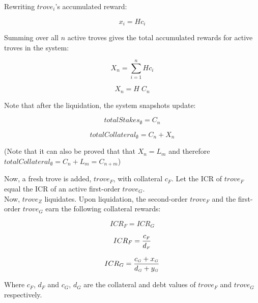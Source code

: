 \documentclass[reqno]{article}
\begin{document}
Rewriting $trove_i$’s accumulated reward:

\begin{equation} \label{eq:45}
    x_i=Hc_i
\end{equation}

\bigskip
Summing over all $n$ active troves gives the total accumulated rewards for active troves in the system:

\begin{equation} 
    X_n=\sum\limits^n_{i=1}Hc_i
\end{equation}

\begin{equation} \label{eq:47}
    X_n=H \; C_n
\end{equation}

\bigskip
Note that after the liquidation, the system snapshots update:

\begin{equation} \label{eq:8}
    totalStakes_\emptyset=C_n
\end{equation}

\begin{equation} \label{eq:9}
    totalCollateral_\emptyset=C_n+X_n
\end{equation}

\bigskip
(Note that it can also be proved that that $X_n=L_m$ and therefore $totalCollateral_\emptyset=C_n+L_m=C_{n+m}$)

\bigskip
Now, a fresh trove is added, $trove_F$, with collateral $c_F$.  Let the ICR of $trove_F$ equal the ICR of an active first-order $trove_G$.\\

Now, $trove_Z$ liquidates. Upon liquidation, the second-order $trove_F$ and the first-order $trove_G$ earn the following collateral rewards:

\begin{equation} \label{eq:10}
    ICR_F=ICR_G
\end{equation}

\begin{equation} 
    ICR_F=\frac{c_\mathsmaller{F}}{d_\mathsmaller{F}}
\end{equation}

\begin{equation} 
    ICR_G=\frac{c_\mathsmaller{G}+x_\mathsmaller{G}}{d_\mathsmaller{G}+y_\mathsmaller{G}}
\end{equation}

\bigskip
Where $c_F$, $d_F$ and $c_G$, $d_G$ are the collateral and debt values of $trove_F$ and $trove_G$ respectively.\\
\end{document}
